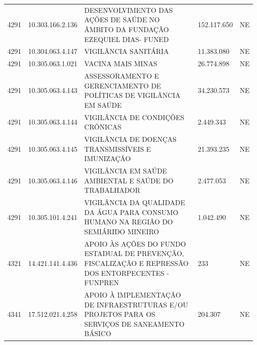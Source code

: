 \documentclass{article}
\begin{document}
\begin{longtable}[c]{m{1cm}|m{2cm}|m{10cm}|m{2cm}|m{1cm}}
\multicolumn{1}{C{1cm}|}{4291} & \multicolumn{1}{C{2cm}|}{10.303.166.2.136} & \multicolumn{1}{L{10cm}|}{DESENVOLVIMENTO DAS AÇÕES DE SAÚDE NO ÂMBITO DA FUNDAÇÃO EZEQUIEL DIAS- FUNED} & \multicolumn{1}{R{2cm}|}{152.117.650} & \multicolumn{1}{C{1cm}}{NE} \\
\multicolumn{1}{C{1cm}|}{4291} & \multicolumn{1}{C{2cm}|}{10.304.063.4.147} & \multicolumn{1}{L{10cm}|}{VIGILÂNCIA SANITÁRIA} & \multicolumn{1}{R{2cm}|}{11.383.080} & \multicolumn{1}{C{1cm}}{NE} \\
\multicolumn{1}{C{1cm}|}{4291} & \multicolumn{1}{C{2cm}|}{10.305.063.1.021} & \multicolumn{1}{L{10cm}|}{VACINA MAIS MINAS} & \multicolumn{1}{R{2cm}|}{26.774.898} & \multicolumn{1}{C{1cm}}{NE} \\
\multicolumn{1}{C{1cm}|}{4291} & \multicolumn{1}{C{2cm}|}{10.305.063.4.143} & \multicolumn{1}{L{10cm}|}{ASSESSORAMENTO E GERENCIAMENTO DE POLÍTICAS DE VIGILÂNCIA EM SAÚDE} & \multicolumn{1}{R{2cm}|}{34.230.573} & \multicolumn{1}{C{1cm}}{NE} \\
\multicolumn{1}{C{1cm}|}{4291} & \multicolumn{1}{C{2cm}|}{10.305.063.4.144} & \multicolumn{1}{L{10cm}|}{VIGILÂNCIA DE CONDIÇÕES CRÔNICAS} & \multicolumn{1}{R{2cm}|}{2.449.343} & \multicolumn{1}{C{1cm}}{NE} \\
\multicolumn{1}{C{1cm}|}{4291} & \multicolumn{1}{C{2cm}|}{10.305.063.4.145} & \multicolumn{1}{L{10cm}|}{VIGILÂNCIA DE DOENÇAS TRANSMISSÍVEIS E IMUNIZAÇÃO} & \multicolumn{1}{R{2cm}|}{21.393.235} & \multicolumn{1}{C{1cm}}{NE} \\
\multicolumn{1}{C{1cm}|}{4291} & \multicolumn{1}{C{2cm}|}{10.305.063.4.146} & \multicolumn{1}{L{10cm}|}{VIGILÂNCIA EM SAÚDE AMBIENTAL E SAÚDE DO TRABALHADOR} & \multicolumn{1}{R{2cm}|}{2.477.053} & \multicolumn{1}{C{1cm}}{NE} \\
\multicolumn{1}{C{1cm}|}{4291} & \multicolumn{1}{C{2cm}|}{10.305.101.4.241} & \multicolumn{1}{L{10cm}|}{VIGILÂNCIA DA QUALIDADE DA ÁGUA PARA CONSUMO HUMANO NA REGIÃO DO SEMIÁRIDO MINEIRO} & \multicolumn{1}{R{2cm}|}{1.042.490} & \multicolumn{1}{C{1cm}}{NE} \\
\multicolumn{1}{C{1cm}|}{4321} & \multicolumn{1}{C{2cm}|}{14.421.141.4.436} & \multicolumn{1}{L{10cm}|}{APOIO ÀS AÇÕES DO FUNDO ESTADUAL DE PREVENÇÃO, FISCALIZAÇÃO E REPRESSÃO DOS ENTORPECENTES - FUNPREN} & \multicolumn{1}{R{2cm}|}{233} & \multicolumn{1}{C{1cm}}{NE} \\
\multicolumn{1}{C{1cm}|}{4341} & \multicolumn{1}{C{2cm}|}{17.512.021.4.258} & \multicolumn{1}{L{10cm}|}{APOIO À IMPLEMENTAÇÃO DE INFRAESTRUTURAS E/OU PROJETOS PARA OS SERVIÇOS DE SANEAMENTO BÁSICO} & \multicolumn{1}{R{2cm}|}{204.307} & \multicolumn{1}{C{1cm}}{NE} \\

\end{longtable}
\end{document}
